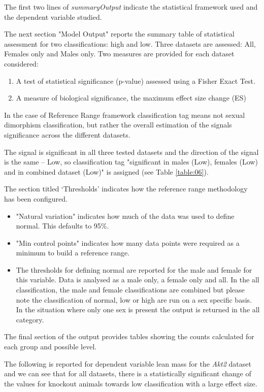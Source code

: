 \documentclass[12pt,a4paper]{article}
\begin{document}
The first two lines of \textit{summaryOutput} indicate the statistical framework used and the dependent variable studied.  

The next section "Model Output" reports the summary table of statistical assessment for two classifications: high and low. Three datasets are assessed: All, Females only and Males only. Two measures are provided for each dataset considered:
\begin{enumerate}
\item A test of statistical significance (p-value) assessed using a Fisher Exact Test. 
\item A measure of biological significance, the maximum effect size change (ES)
\end{enumerate}

In the case of Reference Range framework classification tag means not sexual dimorphism classification, but rather the overall estimation of the signals significance across the different datasets.

The signal is significant in all three tested datasets and the direction of the signal is the same -- Low, so classification tag "significant in males (Low), females (Low) and in combined dataset (Low)" is assigned (see Table \ref{table:06}).

The section titled ‘Thresholds’ indicates how the reference range methodology has been configured.  
\begin{itemize}
\item "Natural variation" indicates how much of the data was used to define normal.  This defaults to 95\%. 
\item "Min control points" indicates how many data points were required as a minimum to build a reference range.  
\item The thresholds for defining normal are reported for the male and female for this variable.  Data is analysed as a male only, a female only and all.  In the all classification, the male and female classifications are combined but please note the classification of normal, low or high are run on a sex specific basis.  In the situation where only one sex is present the output is returned in the all category. 
\end{itemize}

The final section of the output provides tables showing the counts calculated for each group and possible level. 

The following is reported for dependent variable lean mass for the \textit{Akt2} dataset and we can see that for all datasets, there is a statistically significant change of the values for knockout animals towards low classification with a large effect size.
\end{document}
